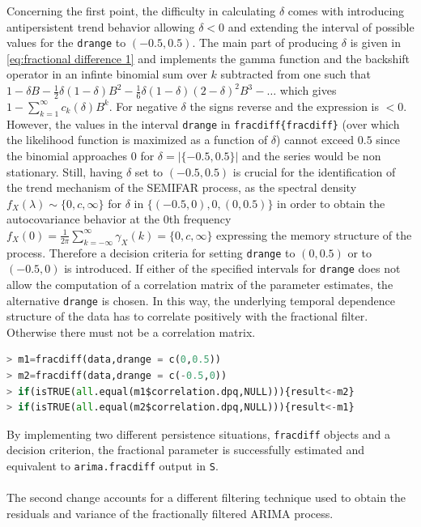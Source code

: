 \documentclass[12pt]{article}
\newcommand{\code}[1]{\texttt{#1}}
\begin{document}
Concerning the first point, the difficulty in calculating \( \delta \) comes with introducing antipersistent trend behavior allowing \( \delta < 0 \) and extending the interval of possible values for the \code{drange} to \((-0.5,0.5)\). 
The main part of producing \( \delta \) is given in \eqref{eq:fractional difference 1} and implements the gamma function and the backshift operator in an infinte binomial sum over \(k\) subtracted from one such that  \(1 - \delta B - \frac{1}{2}\delta(1-\delta) B^{2} - \frac{1}{6} \delta(1-\delta)(2-\delta)^{2} B^{3} - \ldots\) which gives \(  1 - \sum_{k=1}^{\infty} c_k(\delta) B^{k} \). 
For negative \( \delta \) the signs reverse and the expression is \(< 0\).
However, the values in the interval \code{drange} in \code{fracdiff\{fracdiff\}} (over which the likelihood function is maximized as a function of \( \delta \)) cannot exceed \(0.5\) since the binomial approaches \(0\) for \( \delta = |\{-0.5,0.5\}| \) and the series would be non stationary.
Still, having \(\delta\) set to \((-0.5,0.5)\) is crucial for the identification of the trend mechanism of the SEMIFAR process, as the spectral density \(f_{X}(\lambda) \sim \lbrace0,c,\infty\rbrace\) for \(\delta\) in \(\lbrace(-0.5,0),0,(0,0.5)\rbrace\) in order to obtain the autocovariance behavior at the \(0\)th frequency \(f_X(0) = \frac{1}{2 \pi} \sum_{k=-\infty}^{\infty}\gamma_{X}(k) = \lbrace0,c,\infty\rbrace\) expressing the memory structure of the process.
Therefore a decision criteria for setting \code{drange} to \((0,0.5)\) or to \((-0.5,0)\) is introduced. 
If either of the specified intervals for \code{drange} does not allow the computation of a correlation matrix of the parameter estimates, the alternative \code{drange} is chosen. 
In this way, the underlying temporal dependence structure of the data has to correlate positively with the fractional filter. Otherwise there must not be a correlation matrix. 
\begin{lstlisting}[language=Python]
> m1=fracdiff(data,drange = c(0,0.5))
> m2=fracdiff(data,drange = c(-0.5,0))
> if(isTRUE(all.equal(m1$correlation.dpq,NULL))){result<-m2} 
> if(isTRUE(all.equal(m2$correlation.dpq,NULL))){result<-m1} 
\end{lstlisting}  
By implementing two different persistence situations, \code{fracdiff} objects and a decision criterion, the fractional parameter 
is successfully estimated and equivalent to \code{arima.fracdiff} output in \code{S}. \\
\\
The second change accounts for a different filtering technique used to obtain the residuals and variance of the fractionally filtered ARIMA process. 
\end{document}
